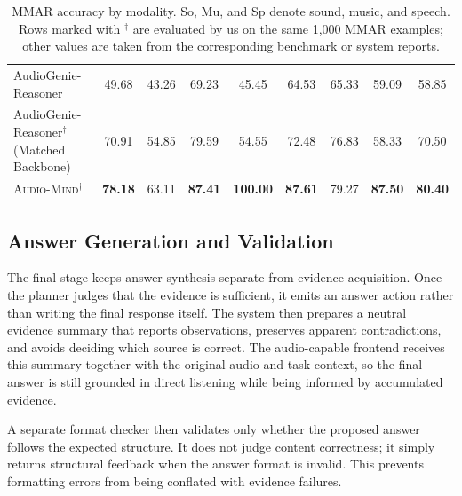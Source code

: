 \documentclass[11pt]{article}
\newcommand{\ours}{\textsc{Audio-Mind}}
\begin{document}
\begin{table}[t]
{\begin{tabular}{lcccccccc}
AudioGenie-Reasoner~\citep{rong2025audiogenie} & 49.68 & 43.26 & 69.23 & 45.45 & 64.53 & 65.33 & 59.09 & 58.85 \\
AudioGenie-Reasoner$^\dagger$ (Matched Backbone)~\citep{rong2025audiogenie} & 70.91 & 54.85 & 79.59 & 54.55 & 72.48 & 76.83 & 58.33 & 70.50 \\
\ours{}$^\dagger$ & \textbf{78.18} & 63.11 & \textbf{87.41} & \textbf{100.00} & \textbf{87.61} & 79.27 & \textbf{87.50} & \textbf{80.40} \\
\bottomrule
\end{tabular}
}
\caption{MMAR accuracy by modality. So, Mu, and Sp denote sound, music, and speech. Rows marked with $^\dagger$ are evaluated by us on the same 1,000 MMAR examples; other values are taken from the corresponding benchmark or system reports.}
\label{tab:mmar_main}
\end{table}


\subsection{Answer Generation and Validation}
\label{sec:answer_generation}

The final stage keeps answer synthesis separate from evidence acquisition. Once the planner judges that the evidence is sufficient, it emits an answer action rather than writing the final response itself. The system then prepares a neutral evidence summary that reports observations, preserves apparent contradictions, and avoids deciding which source is correct. The audio-capable frontend receives this summary together with the original audio and task context, so the final answer is still grounded in direct listening while being informed by accumulated evidence.

A separate format checker then validates only whether the proposed answer follows the expected structure. It does not judge content correctness; it simply returns structural feedback when the answer format is invalid. This prevents formatting errors from being conflated with evidence failures.
\end{document}
